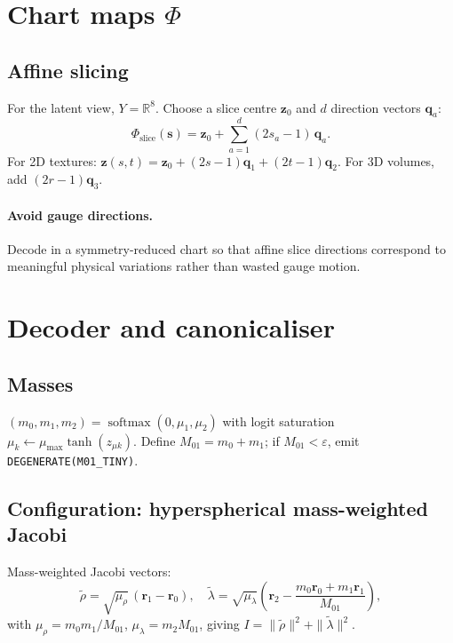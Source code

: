 \documentclass[11pt]{report}
\def\boldsymbol#1{#1}%
\DeclareMathOperator{\softmax}{softmax}
\newcommand{\explcoord}{\mathbf s}
\begin{document}
\section{Chart maps $\Phi$}
\label{sec:charts}

\subsection{Affine slicing}
\label{sec:slicing}

For the latent view, $Y=\mathbb R^{8}$. Choose a slice centre $\mathbf z_0$ and $d$ direction vectors $\mathbf q_a$:
\[
\boxed{\Phi_{\mathrm{slice}}(\explcoord)=\mathbf z_0+\sum_{a=1}^{d}(2s_a-1)\,\mathbf q_a.}
\]
For 2D textures: $\mathbf z(s,t) = \mathbf z_0 + (2s-1)\mathbf q_1 + (2t-1)\mathbf q_2$. For 3D volumes, add $(2r-1)\mathbf q_3$.

\paragraph{Avoid gauge directions.} Decode in a symmetry-reduced chart so that affine slice directions correspond to meaningful physical variations rather than wasted gauge motion.

\section{Decoder and canonicaliser}
\label{sec:decoder}

\subsection{Masses}
\label{sec:mass_decode}

$(m_0,m_1,m_2)=\softmax(0,\mu_1,\mu_2)$ with logit saturation $\mu_k \leftarrow \mu_{\max}\tanh(z_{\mu k})$. Define $M_{01}=m_0+m_1$; if $M_{01}<\varepsilon$, emit \texttt{DEGENERATE(M01\_TINY)}.

\subsection{Configuration: hyperspherical mass-weighted Jacobi}
\label{sec:hyperspherical_jacobi}

Mass-weighted Jacobi vectors:
\[
\tilde{\boldsymbol\rho}=\sqrt{\mu_\rho}\,(\mathbf r_1-\mathbf r_0),\quad \tilde{\boldsymbol\lambda}=\sqrt{\mu_\lambda}\left(\mathbf r_2-\frac{m_0\mathbf r_0+m_1\mathbf r_1}{M_{01}}\right),
\]
with $\mu_\rho=m_0 m_1/M_{01}$, $\mu_\lambda=m_2 M_{01}$, giving $I=\|\tilde{\boldsymbol\rho}\|^2+\|\tilde{\boldsymbol\lambda}\|^2$.
\end{document}
